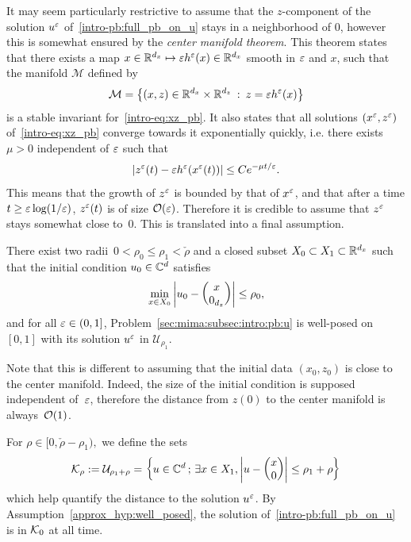 It may seem particularly restrictive to assume that the $z$-component of the solution $u^{\varepsilon}$ of~\eqref{intro-pb:full_pb_on_u} 
stays in a neighborhood of $0$, however this is somewhat ensured by the \textit{center manifold theorem}. 
This theorem states that there exists a map $x \in \mathbb{R}^{d_x} \mapsto \varepsilon h^{\varepsilon}(x) \in \mathbb{R}^{d_x}$ smooth in $\varepsilon$ and $x$, 
such that the manifold $\mathcal{M}$ defined by 
$$ \mathcal M = \left\{ (x,z) \in \mathbb{R}^{d_x} \times \mathbb{R}^{d_z} \: : \: z = \varepsilon h^{\varepsilon}(x) \right\} $$
is a stable invariant for~\eqref{intro-eq:xz_pb}. 
It also states that all solutions $(x^{\varepsilon}, z^{\varepsilon})$ of~\eqref{intro-eq:xz_pb} 
converge towards it exponentially quickly, 
i.e. there exists $\mu > 0$ independent of $\varepsilon$ such that 
\begin{equation} \label{approx_eq:cent_manifold}
\left| z^{\varepsilon}(t) - \varepsilon h^{\varepsilon}(x^{\varepsilon}(t)) \right| \leq C e^{-\mu t/\varepsilon} .
\end{equation} 
%
This means that the growth of $z^{\varepsilon}$ is bounded by that of $x^{\varepsilon}$, 
and that after a time $t \geq \varepsilon \log(1/\varepsilon)$, $z^{\varepsilon}(t)$ is of size $\mathcal{O}(\varepsilon)$. 
Therefore it is credible to assume that $z^{\varepsilon}$ stays somewhat close to~$0$. 
This is translated into a final assumption. 

\begin{assumption} \label{approx_hyp:well_posed} 
There exist two radii~$0 < \rho_0 \leq \rho_1 < \check{\rho}$ 
and a closed subset $X_0 \subset X_1 \subset \mathbb{R}^{d_x}$ 
such that the initial condition $ u_0 \in \mathbb{C}^d $ satisfies 
$$ 
\min_{x \in X_0} \left| u_0 - \begin{pmatrix} x \\ 0_{d_z} \end{pmatrix} \right| \leq \rho_0 , 
$$ 
and for all $\varepsilon \in (0,1]$, 
Problem~\eqref{sec:mima:subsec:intro:pb:u} is well-posed on $[0,1]$ 
with its solution $u^{\varepsilon}$ in $\mathcal{U}_{\rho_1}$. 
\end{assumption} 
Note that this is different to assuming that the initial data $(x_0, z_0)$ 
is close to the center manifold. 
Indeed, the size of the initial condition is supposed independent of~$\varepsilon$, 
therefore the distance from $z(0)$ to the center manifold is always~$\mathcal{O}(1)$. 

%

For $\rho \in [0, \check{\rho} - \rho_1),$ we define the sets 
\begin{equation} \label{approx_def:set_K}
\mathcal{K}_{\rho} := \mathcal{U}_{\rho_1 + \rho} = \left\{ u \in \mathbb{C}^d \,;\, \exists x \in X_1, \left| u - \begin{pmatrix} x \\ 0 \end{pmatrix} \right| \leq \rho_1 + \rho \right\} 
\end{equation} 
which help quantify the distance to the solution $u^{\varepsilon}$. 
By Assumption~\ref{approx_hyp:well_posed}, the solution of~\eqref{intro-pb:full_pb_on_u} 
is in $\mathcal{K}_0$ at all time. 

